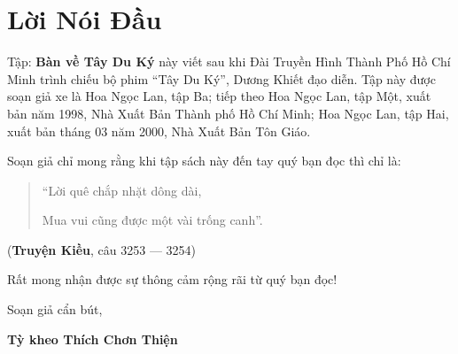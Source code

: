 \chapter*{Lời Nói Đầu} %
\label{cha:loi_noi_dau}

Tập: {\bf Bàn về Tây Du Ký} này viết sau khi Đài Truyền Hình Thành Phố Hồ Chí Minh trình chiếu bộ phim ``Tây Du Ký'', Dương Khiết đạo diễn. Tập này được soạn giả xe là Hoa Ngọc Lan, tập Ba; tiếp theo Hoa Ngọc Lan, tập Một, xuất bản năm 1998, Nhà Xuất Bản Thành phố Hồ Chí Minh; Hoa Ngọc Lan, tập Hai, xuất bản tháng 03 năm 2000, Nhà Xuất Bản Tôn Giáo.

Soạn giả chỉ mong rằng khi tập sách này đến tay quý bạn đọc thì chỉ là:

\begin{verse}
\begin{itshape}
``Lời quê chắp nhặt dông dài,

Mua vui cũng được một vài trống canh''.
\end{itshape}
\end{verse}

\hfill
({\bf Truyện Kiều}, câu 3253 — 3254)

Rất mong nhận được sự thông cảm rộng rãi từ quý bạn đọc!

\vfill
\hfill
\begin{minipage}{0.6\textwidth}
\begin{center}
Soạn giả cẩn bút,

{\bf Tỳ kheo Thích Chơn Thiện}
\end{center}
\end{minipage}
\vfill
